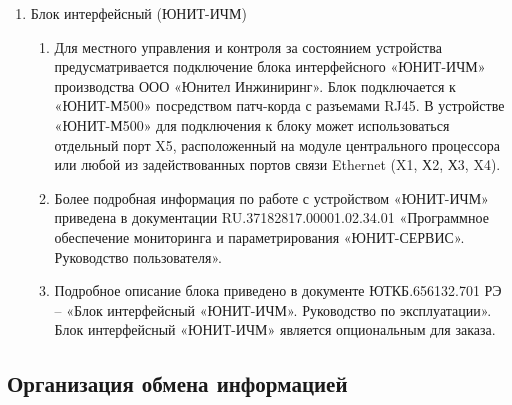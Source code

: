 \documentclass[a4paper, 12pt, table, hidelinks, DIV=calc]{extarticle}
\begin{document}
\begin{enumerate}[label=\arabic{section}.\arabic{subsection}.\arabic*, labelsep=7pt, leftmargin=0pt, itemindent=60pt, align=left]
\begin{enumerate}
\end{enumerate}

\item\label{sec1:hmi} Блок интерфейсный (ЮНИТ-ИЧМ)

\begin{enumerate}

\item
Для местного управления и контроля за состоянием устройства предусматривается подключение блока интерфейсного «ЮНИТ-ИЧМ» производства ООО «Юнител Инжиниринг».
Блок подключается к «ЮНИТ-М500» посредством патч-корда с разъемами RJ45. В устройстве «ЮНИТ-М500» для подключения к блоку может использоваться отдельный порт X5, расположенный на модуле центрального процессора или любой из задействованных портов связи Ethernet (X1, Х2, Х3, X4).

\item
Более подробная информация по работе с устройством «ЮНИТ-ИЧМ» приведена в документации RU.37182817.00001.02.34.01 «Программное обеспечение мониторинга и параметрирования «ЮНИТ-СЕРВИС». Руководство пользователя».

\item
Подробное описание блока приведено в документе ЮТКБ.656132.701 РЭ – «Блок интерфейсный «ЮНИТ-ИЧМ». Руководство по эксплуатации». Блок интерфейсный «ЮНИТ-ИЧМ» является опциональным для заказа.

\end{enumerate}

\end{enumerate}


\color{unidarkgreen}\subsection{Организация обмена информацией}\color{black}
\end{document}
